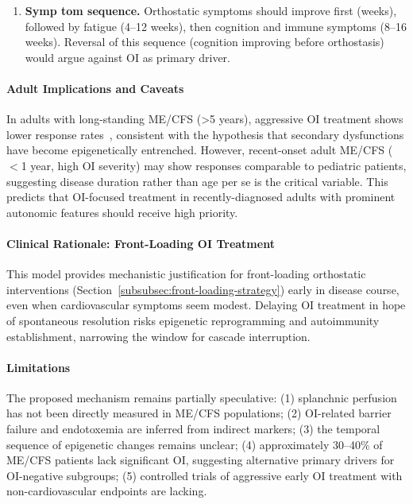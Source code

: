 \begin{keypoint}
\begin{enumerate}
    \item \textbf{Symp tom sequence.} Orthostatic symptoms should improve first (weeks), followed by fatigue (4--12 weeks), then cognition and immune symptoms (8--16 weeks). Reversal of this sequence (cognition improving before orthostasis) would argue against OI as primary driver.
\end{enumerate}

\paragraph{Adult Implications and Caveats}
In adults with long-standing ME/CFS (>5 years), aggressive OI treatment shows lower response rates~\cite{Newton2007}, consistent with the hypothesis that secondary dysfunctions have become epigenetically entrenched. However, recent-onset adult ME/CFS ($<$1 year, high OI severity) may show responses comparable to pediatric patients, suggesting disease duration rather than age per se is the critical variable. This predicts that OI-focused treatment in recently-diagnosed adults with prominent autonomic features should receive high priority.

\paragraph{Clinical Rationale: Front-Loading OI Treatment}
This model provides mechanistic justification for front-loading orthostatic interventions (Section~\ref{subsubsec:front-loading-strategy}) early in disease course, even when cardiovascular symptoms seem modest. Delaying OI treatment in hope of spontaneous resolution risks epigenetic reprogramming and autoimmunity establishment, narrowing the window for cascade interruption.

\paragraph{Limitations}
The proposed mechanism remains partially speculative: (1) splanchnic perfusion has not been directly measured in ME/CFS populations; (2) OI-related barrier failure and endotoxemia are inferred from indirect markers; (3) the temporal sequence of epigenetic changes remains unclear; (4) approximately 30--40\% of ME/CFS patients lack significant OI, suggesting alternative primary drivers for OI-negative subgroups; (5) controlled trials of aggressive early OI treatment with non-cardiovascular endpoints are lacking.


\end{keypoint}
